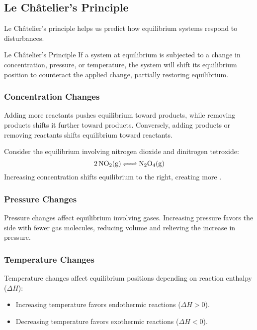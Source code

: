 \subsection{Le Châtelier's Principle}
 Le Châtelier's principle helps us predict how equilibrium systems respond to disturbances.

\begin{keyconcept}{Le Châtelier's Principle}
If a system at equilibrium is subjected to a change in concentration, pressure, or temperature, the system will shift its equilibrium position to counteract the applied change, partially restoring equilibrium.
\end{keyconcept}

\subsubsection{Concentration Changes}
Adding more reactants pushes equilibrium toward products, while removing products shifts it further toward products. Conversely, adding products or removing reactants shifts equilibrium toward reactants.

\begin{example}
Consider the equilibrium involving nitrogen dioxide and dinitrogen tetroxide:
\[
\ce{2NO2(g) <=> N2O4(g)}
\]
Increasing  concentration shifts equilibrium to the right, creating more . 
\end{example}

\subsubsection{Pressure Changes}
Pressure changes affect equilibrium involving gases. Increasing pressure favors the side with fewer gas molecules, reducing volume and relieving the increase in pressure.

\subsubsection{Temperature Changes}
Temperature changes affect equilibrium positions depending on reaction enthalpy (\(\Delta H\)):

\begin{itemize}
\item Increasing temperature favors endothermic reactions (\(\Delta H>0\)).
\item Decreasing temperature favors exothermic reactions (\(\Delta H<0\)).
\end{itemize}

